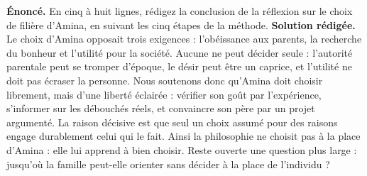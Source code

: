 \documentclass[11pt]{article}
\begin{document}
\begin{exoresolu}
\textbf{Énoncé.} En cinq à huit lignes, rédigez la conclusion de la réflexion sur le choix de filière d'Amina, en suivant les cinq étapes de la méthode.
\tcblower
\textbf{Solution rédigée.} Le choix d'Amina opposait trois exigences : l'obéissance aux parents, la recherche du bonheur et l'utilité pour la société. Aucune ne peut décider seule : l'autorité parentale peut se tromper d'époque, le désir peut être un caprice, et l'utilité ne doit pas écraser la personne. Nous soutenons donc qu'Amina doit choisir librement, mais d'une liberté éclairée : vérifier son goût par l'expérience, s'informer sur les débouchés réels, et convaincre son père par un projet argumenté. La raison décisive est que seul un choix assumé pour des raisons engage durablement celui qui le fait. Ainsi la philosophie ne choisit pas à la place d'Amina : elle lui apprend à bien choisir. Reste ouverte une question plus large : jusqu'où la famille peut-elle orienter sans décider à la place de l'individu ?
\end{exoresolu}
\end{document}
